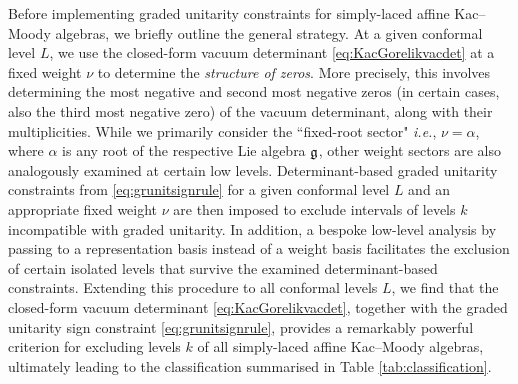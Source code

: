 Before implementing graded unitarity constraints for simply-laced affine Kac--Moody algebras, we briefly outline the general strategy. At a given conformal level $L$, we use the closed-form vacuum determinant \eqref{eq:KacGorelikvacdet} at a fixed weight $\nu$ to determine the \emph{structure of zeros}. More precisely, this involves determining the most negative and second most negative zeros (in certain cases, also the third most negative zero) of the vacuum determinant, along with their multiplicities. While we primarily consider the ``fixed-root sector" \emph{i.e.}, $\nu = \alpha$, where $\alpha$ is any root of the respective Lie algebra $\mathfrak{g}$, other weight sectors are also analogously examined at certain low levels. Determinant-based graded unitarity constraints from \eqref{eq:grunitsignrule} for a given conformal level $L$ and an appropriate fixed weight $\nu$ are then imposed to exclude intervals of levels $k$ incompatible with graded unitarity. In addition, a bespoke low-level analysis by passing to a representation basis instead of a weight basis facilitates the exclusion of certain isolated levels that survive the examined determinant-based constraints. Extending this procedure to all conformal levels $L$, we find that the closed-form vacuum determinant \eqref{eq:KacGorelikvacdet}, together with the graded unitarity sign constraint \eqref{eq:grunitsignrule}, provides a remarkably powerful criterion for excluding levels $k$ of all simply-laced affine Kac--Moody algebras, ultimately leading to the classification summarised in Table \ref{tab:classification}.

